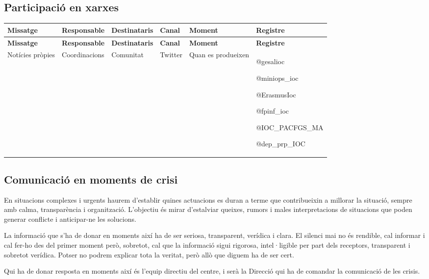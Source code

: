 \documentclass[fontsize=10pt,%
paper=a4,%
DIV=14,%
pagesize=auto,%
parskip=half,
captions=tableheading,%
numbers=noenddot,%
toc=graduated%
]{scrartcl}
\renewcommand{\arraystretch}{1.75}%
\renewcommand{\arraystretch}{1.75}%
\begin{document}
\subsection{Participació en xarxes}


\small{
\setlength{\tabcolsep}{10pt}
\renewcommand{\arraystretch}{1.5}
\begin{longtable}{p{3cm}p{2cm}p{2cm}p{1.5cm}p{2cm}p{1.5cm}}
\hline
\textbf{Missatge} & \textbf{Responsable} & \textbf{Destinataris} & \textbf{Canal} & \textbf{Moment}    & \textbf{Registre} \\
\hline \endfirsthead
\hline
\textbf{Missatge} & \textbf{Responsable} & \textbf{Destinataris} & \textbf{Canal} & \textbf{Moment}    & \textbf{Registre} \\
\hline \endhead
Notícies pròpies  & Coordinacions        & Comunitat             & Twitter        & Quan es produeixen & @gesalioc

@miniops\_ioc

@ErasmusIoc

@fpinf\_ioc

@IOC\_PACFGS\_MA

@dep\_prp\_IOC                                                                                                             \\
\end{longtable}
}%


\subsection{Comunicació en moments de crisi}

En situacions complexes i urgents haurem d'establir quines actuacions es duran a terme que contribueixin a millorar la situació, sempre amb calma, transparència i organització. L'objectiu és mirar d'estalviar queixes, rumors i
males interpretacions de situacions que poden generar conflicte i anticipar-ne les solucions.

La informació que s'ha de donar en moments així ha de ser seriosa, transparent, verídica i clara. El silenci mai no és rendible, cal informar i cal fer-ho des del primer moment però, sobretot, cal que la informació sigui rigorosa, intel·ligible per part dels receptors, transparent i sobretot verídica. Potser no podrem explicar tota la veritat, però allò que diguem ha de ser cert.

Qui ha de donar resposta en moments així és l'equip directiu del centre, i
serà la Direcció qui ha de comandar la comunicació de les crisis.
\end{document}
